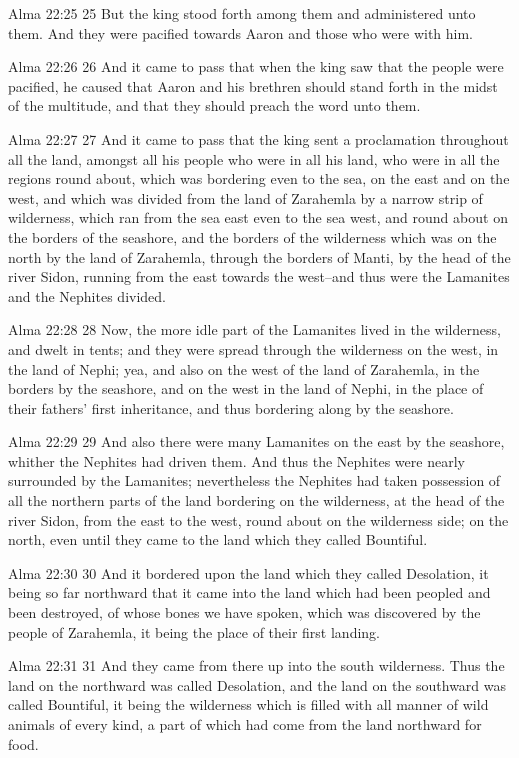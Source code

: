 Alma 22:25
 25 But the king stood forth among them and administered unto
them. And they were pacified towards Aaron and those who were
with him.

Alma 22:26
 26 And it came to pass that when the king saw that the people
were pacified, he caused that Aaron and his brethren should stand
forth in the midst of the multitude, and that they should preach
the word unto them.

Alma 22:27
 27 And it came to pass that the king sent a proclamation
throughout all the land, amongst all his people who were in all
his land, who were in all the regions round about, which was
bordering even to the sea, on the east and on the west, and which
was divided from the land of Zarahemla by a narrow strip of
wilderness, which ran from the sea east even to the sea west, and
round about on the borders of the seashore, and the borders of
the wilderness which was on the north by the land of Zarahemla,
through the borders of Manti, by the head of the river Sidon,
running from the east towards the west--and thus were the
Lamanites and the Nephites divided.

Alma 22:28
 28 Now, the more idle part of the Lamanites lived in the
wilderness, and dwelt in tents; and they were spread through the
wilderness on the west, in the land of Nephi; yea, and also on
the west of the land of Zarahemla, in the borders by the
seashore, and on the west in the land of Nephi, in the place of
their fathers' first inheritance, and thus bordering along by the
seashore.

Alma 22:29
 29 And also there were many Lamanites on the east by the
seashore, whither the Nephites had driven them. And thus the
Nephites were nearly surrounded by the Lamanites; nevertheless
the Nephites had taken possession of all the northern parts of
the land bordering on the wilderness, at the head of the river
Sidon, from the east to the west, round about on the wilderness
side; on the north, even until they came to the land which they
called Bountiful.

Alma 22:30
 30 And it bordered upon the land which they called Desolation,
it being so far northward that it came into the land which had
been peopled and been destroyed, of whose bones we have spoken,
which was discovered by the people of Zarahemla, it being the
place of their first landing.

Alma 22:31
 31 And they came from there up into the south wilderness. Thus
the land on the northward was called Desolation, and the land on
the southward was called Bountiful, it being the wilderness which
is filled with all manner of wild animals of every kind, a part
of which had come from the land northward for food.

